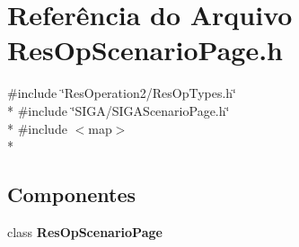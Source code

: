 \section{Referência do Arquivo Res\+Op\+Scenario\+Page.\+h}
\label{_res_op_scenario_page_8h}
{\ttfamily \#include \char`\"{}Res\+Operation2/\+Res\+Op\+Types.\+h\char`\"{}}\\*
{\ttfamily \#include \char`\"{}S\+I\+G\+A/\+S\+I\+G\+A\+Scenario\+Page.\+h\char`\"{}}\\*
{\ttfamily \#include $<$map$>$}\\*
\subsection*{Componentes}
\begin{DoxyCompactItemize}
\item 
class {\bf Res\+Op\+Scenario\+Page}
\end{DoxyCompactItemize}
